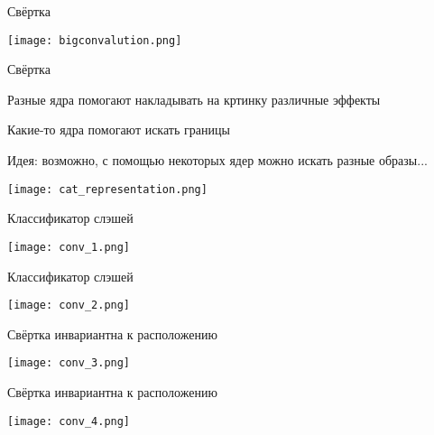 \documentclass[notes,12pt, aspectratio=169]{beamer}
\newenvironment{wideitemize}{\itemize\addtolength{\itemsep}{10pt}}{\enditemize}
\begin{document}
\begin{frame}{Свёртка}
\begin{center}
	\texttt{[image: bigconvalution.png]}
\end{center}
\end{frame}


{
	\begin{frame}
\end{frame}
}



\begin{frame}{Свёртка}
\begin{wideitemize}
	\item Разные ядра помогают накладывать на кртинку различные эффекты
	\item Какие-то ядра помогают искать границы
	\item \alert{Идея:} возможно, с помощью некоторых ядер можно искать разные образы...
\end{wideitemize}

\begin{center}
	\texttt{[image: cat\_representation.png]}
\end{center}
\end{frame}



\begin{frame}{Классификатор слэшей}
\begin{center}
	\texttt{[image: conv\_1.png]}
\end{center}
\end{frame}


\begin{frame}{Классификатор слэшей}
\begin{center}
	\texttt{[image: conv\_2.png]}
\end{center}
\end{frame}


\begin{frame}{Свёртка инвариантна к расположению}
\begin{center}
	\texttt{[image: conv\_3.png]}
\end{center}
\end{frame}


\begin{frame}{Свёртка инвариантна к расположению}
\begin{center}
	\texttt{[image: conv\_4.png]}
\end{center}
\end{frame}
\end{document}
